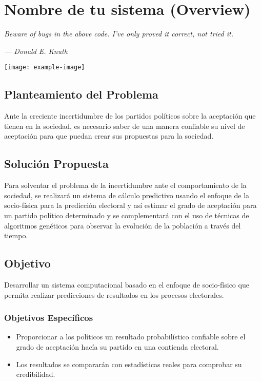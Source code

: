 \chapter{Nombre de tu sistema (Overview)}
\epigraph{\textit{Beware of bugs in the above code. I've only proved it correct, not tried it.     
	}}{\textit{—  Donald E. Knuth}}
	\vspace*{8cm}
	\begin{center}
		\centering %
		\texttt{[image: example-image]}
	\end{center}
	\thispagestyle{empty}
	\newpage
	\vspace*{2cm}
\section{Planteamiento del Problema}
Ante la creciente incertidumbre de los partidos políticos sobre la aceptación que tienen en la sociedad, es necesario saber de una manera confiable su nivel de aceptación para que puedan crear sus propuestas para la sociedad.

\section{Solución Propuesta}
Para solventar el problema de la incertidumbre ante el comportamiento de la sociedad, se realizará un sistema de cálculo predictivo usando el enfoque de la socio-física para la predicción electoral y así estimar el grado de aceptación para un partido político determinado y se complementará con el uso de técnicas de algoritmos genéticos para observar la evolución de la población a través del tiempo.

\section{Objetivo}
Desarrollar un sistema computacional basado en el enfoque de socio-físico que permita realizar predicciones de resultados en los procesos electorales. 

\subsection{Objetivos Específicos}
\begin{itemize}
    \item Proporcionar a los políticos un resultado probabilístico confiable sobre el grado de aceptación hacía su partido en una contienda electoral.
    \item Los resultados se compararán con estadísticas reales para comprobar su credibilidad.
\end{itemize}


